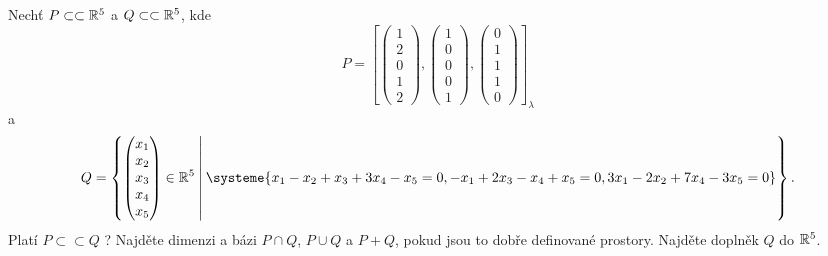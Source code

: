\documentclass{article}
\newcommand{\mathfield}{\ensuremath{\mathbb}}
\newcommand{\subspace}{\ensuremath{\subset \subset}}
\begin{document}
\newpage

\begin{Exercise}[name=Úkol, label=subspaces]
	Nechť \( P \subspace \mathfield{R}^5 \) a \( Q \subspace \mathfield{R}^5 \), kde
	\[
		P = \left[
			\begin{pmatrix} 1 \\ 2 \\ 0 \\ 1 \\ 2 \end{pmatrix},
			\begin{pmatrix} 1 \\ 0 \\ 0 \\ 0 \\ 1 \end{pmatrix},
			\begin{pmatrix} 0 \\ 1 \\ 1 \\ 1 \\ 0 \end{pmatrix}
		\right]_\lambda
	\]
	a
	\[
		Q = \left\{
			\begin{pmatrix} x_1 \\ x_2 \\ x_3 \\ x_4 \\ x_5 \end{pmatrix} \in \mathfield{R}^5
			\: \middle| \:
			\systeme{
				x_1 - x_2 +x_3 + 3x_4 -x_5 = 0,
				-x_1 + 2x_3 - x_4 + x_5 = 0,
				3x_1 - 2x_2 + 7x_4 - 3x_5 = 0
			}
		\right\} \text{.}
	\]
	\Question Platí \( P \subspace Q \) ?
	\Question Najděte dimenzi a bázi \( P \cap Q \), \( P \cup Q \) a \( P + Q \), pokud jsou to dobře definované prostory.
	\Question Najděte doplněk \( Q \) do \( \mathfield{R}^5 \).
\end{Exercise}
\end{document}
